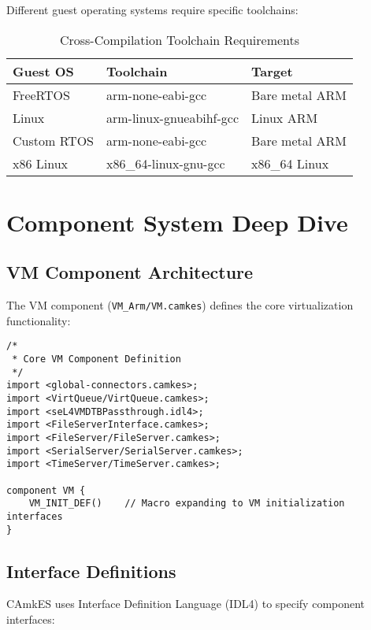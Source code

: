 \documentclass[12pt,a4paper]{article}
\begin{document}
Different guest operating systems require specific toolchains:

\begin{table}[h!]
\centering
\begin{tabular}{@{}lll@{}}
\toprule
\textbf{Guest OS} & \textbf{Toolchain} & \textbf{Target} \\
\midrule
FreeRTOS & arm-none-eabi-gcc & Bare metal ARM \\
Linux & arm-linux-gnueabihf-gcc & Linux ARM \\
Custom RTOS & arm-none-eabi-gcc & Bare metal ARM \\
x86 Linux & x86\_64-linux-gnu-gcc & x86\_64 Linux \\
\bottomrule
\end{tabular}
\caption{Cross-Compilation Toolchain Requirements}
\end{table}

\section{Component System Deep Dive}

\subsection{VM Component Architecture}

The VM component (\texttt{VM\_Arm/VM.camkes}) defines the core virtualization functionality:


\begin{lstlisting}[style=camkes]
/*
 * Core VM Component Definition
 */
import <global-connectors.camkes>;
import <VirtQueue/VirtQueue.camkes>;
import <seL4VMDTBPassthrough.idl4>;
import <FileServerInterface.camkes>;
import <FileServer/FileServer.camkes>;
import <SerialServer/SerialServer.camkes>;
import <TimeServer/TimeServer.camkes>;

component VM {
    VM_INIT_DEF()    // Macro expanding to VM initialization interfaces
}
\end{lstlisting}

\subsection{Interface Definitions}

CAmkES uses Interface Definition Language (IDL4) to specify component interfaces:
\end{document}
